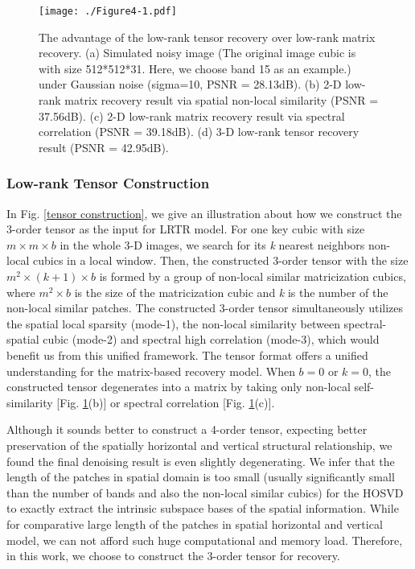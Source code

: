 \documentclass[twocolumn]{svjour3}          %
\begin{document}
\begin{figure}
\begin{center}
    \texttt{[image: ./Figure4-1.pdf]}
\end{center}
   \caption{The advantage of the low-rank tensor recovery over low-rank matrix recovery. (a) Simulated noisy image (The original image cubic is with size 512*512*31. Here, we choose band 15 as an example.) under Gaussian noise (sigma=10, PSNR = 28.13dB). (b) 2-D low-rank matrix recovery result via spatial non-local similarity (PSNR = 37.56dB). (c) 2-D low-rank matrix recovery result via spectral correlation (PSNR = 39.18dB). (d) 3-D low-rank tensor recovery result (PSNR = 42.95dB).}
\label{tensor advantage}
\end{figure}


  \subsubsection{Low-rank Tensor Construction}

    In Fig. \ref{tensor construction}, we give an illustration about how we construct the 3-order tensor as the input for LRTR model. For one key cubic with size $m\times m \times b$ in the whole 3-D images, we search for its \emph{k} nearest neighbors non-local cubics in a local window. Then, the constructed 3-order tensor with the size $m^2 \times (k+1) \times b$ is formed by a group of non-local similar matricization cubics, where $m^2 \times b$ is the size of the matricization cubic and \emph{k} is the number of the non-local similar patches. The constructed 3-order tensor simultaneously utilizes the spatial local sparsity (mode-1), the non-local similarity between spectral-spatial cubic (mode-2) and spectral high correlation (mode-3), which would benefit us from this unified framework. The tensor format offers a unified understanding for the matrix-based recovery model. When $b = 0$ or $k = 0$, the constructed tensor degenerates into a matrix by taking only non-local self-similarity [Fig. \ref{tensor advantage}(b)] or spectral correlation [Fig. \ref{tensor advantage}(c)].

    Although it sounds better to construct a 4-order tensor, expecting better preservation of the spatially horizontal and vertical structural relationship, we found the final denoising result is even slightly degenerating. We infer that the length of the patches in spatial domain is too small (usually significantly small than the number of bands and also the non-local similar cubics) for the HOSVD to exactly extract the intrinsic subspace bases of the spatial information. While for comparative large length of the patches in spatial horizontal and vertical model, we can not afford such huge computational and memory load. Therefore, in this work, we choose to construct the 3-order tensor for recovery.
\end{document}
